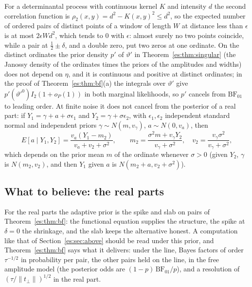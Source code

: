 \begin{remark}\label{es:rem:dpp}
For a determinantal process with continuous kernel $K$ and intensity $d$ the second correlation function is $\rho_2(x,y)=d^2-K(x,y)^2\le d^2$, so the expected number of ordered pairs of distinct points of a window of length $W$ at distance less than $\epsilon$ is at most $2\epsilon Wd^2$, which tends to $0$ with $\epsilon$: almost surely no two points coincide, while a pair at $\tfrac12\pm\delta$, and a double zero, put two zeros at one ordinate. On the distinct ordinates the prior density $p'$ of $\vartheta'$ in Theorem~\ref{es:thm:singular} (the Janossy density of the ordinates times the priors of the amplitudes and widths) does not depend on $\eta$, and it is continuous and positive at distinct ordinates; in the proof of Theorem~\ref{es:thm:bf}(a) the integrals over $\vartheta'$ give $p'(\vartheta'^0)I_2(1+o_P(1))$ in both marginal likelihoods, so $p'$ cancels from $\mathrm{BF}_{01}$ to leading order. At finite noise it does not cancel from the posterior of a real part: if $Y_1=\gamma+a+\sigma\epsilon_1$ and $Y_2=\gamma+\sigma\epsilon_2$, with $\epsilon_1,\epsilon_2$ independent standard normal and independent priors $\gamma\sim N(m,v_\gamma)$, $a\sim N(0,v_a)$, then
\[
E[a\mid Y_1,Y_2]=\frac{v_a(Y_1-m_2)}{v_a+v_2+\sigma^2},\qquad m_2=\frac{\sigma^2m+v_\gamma Y_2}{v_\gamma+\sigma^2},\quad v_2=\frac{v_\gamma\sigma^2}{v_\gamma+\sigma^2},
\]
which depends on the prior mean $m$ of the ordinate whenever $\sigma>0$ (given $Y_2$, $\gamma$ is $N(m_2,v_2)$, and then $Y_1$ given $a$ is $N(m_2+a,v_2+\sigma^2)$).
\end{remark}

\subsection{What to believe: the real parts}

For the real parts the adaptive prior is the spike and slab on pairs of Theorem~\ref{es:thm:bf}: the functional equation supplies the structure, the spike at $\delta=0$ the shrinkage, and the slab keeps the alternative honest. A computation like that of Section~\ref{es:sec:above} should be read under this prior, and Theorem~\ref{es:thm:bf} says what it delivers: under the line, Bayes factors of order $\tau^{-1/2}$ in probability per pair, the other pairs held on the line, in the free amplitude model (the posterior odds are $(1-p)\,\mathrm{BF}_{01}/p$), and a resolution of $(\tau/\|t_\perp\|)^{1/2}$ in the real part.


